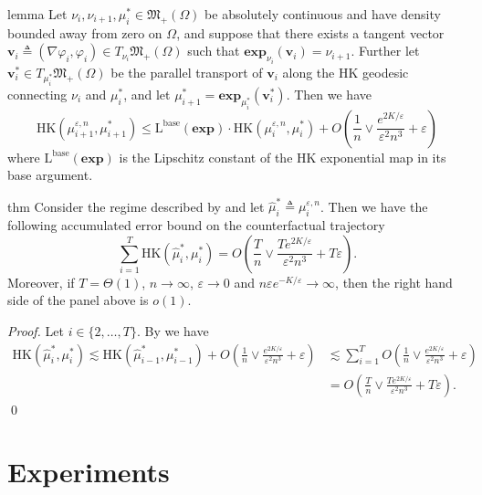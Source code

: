 \documentclass[11pt]{article}
\begin{document}
\begin{restatable}{lemma}{} \label{HK trajectory consistency}
    Let $\nu_{i}, \nu_{i+1}, \mu_i^* \in \mathfrak{M}_+(\Omega)$ be absolutely continuous and have density bounded away from zero on $\Omega$, and suppose that there exists a tangent vector $\mathbf{v}_i \triangleq (\nabla \varphi_i, \varphi_i) \in T_{\nu_i}\mathfrak{M}_+(\Omega)$ such that $\mathbf{exp}_{\nu_i}(\mathbf{v}_i) = \nu_{i+1}$. Further let $\mathbf{v}_i^* \in T_{\mu_i^*}\mathfrak{M}_+(\Omega)$ be the parallel transport of $\mathbf{v}_i$ along the HK geodesic connecting $\nu_i$ and $\mu_i^*$, and let $\mu_{i+1}^* = \mathbf{exp}_{\mu_i^*}(\mathbf{v}_i^*)$. Then we have
    \[\text{HK}(\mu_{i+ 1}^{\varepsilon, n}, \mu_{i + 1}^*) \leq \text{L}^{\text{base}}(\mathbf{exp})\cdot\text{HK}(\mu_{i}^{\varepsilon, n}, \mu_i^*) + O\left(\frac{1}{n} \vee\frac{e^{2K/\varepsilon}}{\varepsilon^2n^3} + \varepsilon\right)\]
    where $\text{L}^{\text{base}}(\mathbf{exp})$ is the Lipschitz constant of the HK exponential map in its base argument.
\end{restatable}

\begin{restatable}{thm}{}
    Consider the regime described by  and let $\hat\mu_{i}^* \triangleq \mu_{i}^{\varepsilon, n}$. Then we have the following accumulated error bound on the counterfactual trajectory
    \[\sum_{i = 1}^T\text{HK}(\hat{\mu}_i^*, \mu_i^*) = O\left(\frac{T}{n} \vee\frac{Te^{2K/\varepsilon}}{\varepsilon^2n^3} + T\varepsilon\right).\]
    Moreover, if $T = \Theta(1)$, $n \rightarrow \infty$, $\varepsilon \rightarrow 0$ and $n\varepsilon e^{-K/\varepsilon} \rightarrow \infty$, then the right hand side of the panel above is $o(1)$. 
\end{restatable}
\noindent \textit{Proof.} Let $i \in \{2, \dots, T\}$. By  we have
\begin{align*}
    \text{HK}(\hat{\mu}_i^*, \mu_i^*) \lesssim \text{HK}(\hat\mu_{i-1}^*, \mu_{i-1}^*) + O\left(\frac{1}{n} \vee\frac{e^{2K/\varepsilon}}{\varepsilon^2n^3} + \varepsilon\right) &\lesssim \sum_{i = 1}^TO\left(\frac{1}{n} \vee\frac{e^{2K/\varepsilon}}{\varepsilon^2n^3} + \varepsilon\right)\\ &= O\left(\frac{T}{n} \vee\frac{Te^{2K/\varepsilon}}{\varepsilon^2n^3} + T\varepsilon\right).
\end{align*} \qed{}

\section{Experiments}
\end{document}
